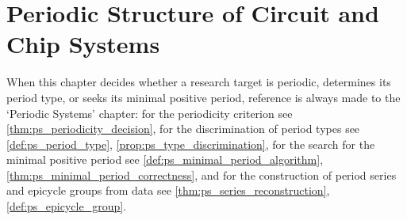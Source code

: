 \chapter{Periodic Structure of Circuit and Chip Systems}

\begin{remark}\label{rem:circuit_ps_hook}
When this chapter decides whether a research target is periodic, determines its period type, or seeks its minimal positive period, reference is always made to the `Periodic Systems' chapter:
for the periodicity criterion see \cref{thm:ps_periodicity_decision},
for the discrimination of period types see \cref{def:ps_period_type}, \cref{prop:ps_type_discrimination},
for the search for the minimal positive period see \cref{def:ps_minimal_period_algorithm}, \cref{thm:ps_minimal_period_correctness},
and for the construction of period series and epicycle groups from data see \cref{thm:ps_series_reconstruction}, \cref{def:ps_epicycle_group}.
\end{remark}

